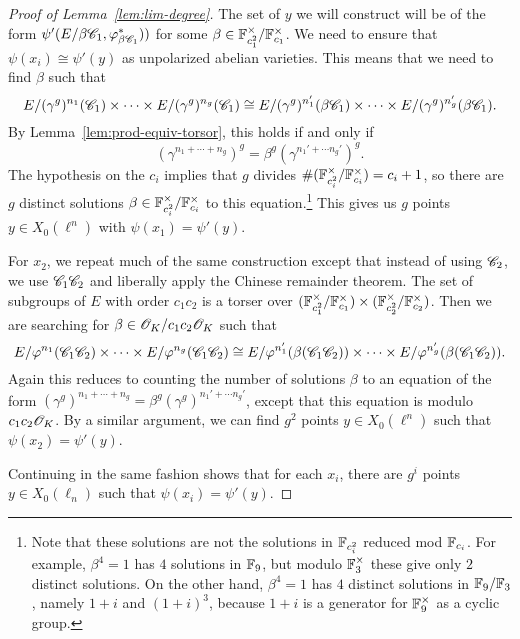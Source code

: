 \documentclass{amsart}
\begin{document}
\begin{proof}[Proof of Lemma~\ref{lem:lim-degree}]
  The set of $y$ we will construct will be of the form $\psi'(E/\beta\mathscr{C}_1,\varphi^{\ast}_{\beta\mathscr{C}_1}))$ for some $\beta \in \mathbb{F}_{c_1^2}^\times/\mathbb{F}_{c_1}^\times$. We need to ensure that $\psi(x_i) \cong \psi'(y)$ as unpolarized abelian varieties. This means that we need to find $\beta$ such that
  \[
    E/(\gamma^g)^{n_1}(\mathscr{C}_1) \times \cdots \times E/(\gamma^g)^{n_g}(\mathscr{C}_1)
    \cong
    E/(\gamma^g)^{n_1'}(\beta\mathscr{C}_1) \times \cdots \times E/(\gamma^g)^{n_g'}(\beta\mathscr{C}_1).
  \]
  By Lemma~\ref{lem:prod-equiv-torsor}, this holds if and only if
  \[
    (\gamma^{n_1 + \cdots + n_g})^g = \beta^g(\gamma^{n_1' + \cdots n_g'})^g.
  \]
  The hypothesis on the $c_i$ implies that $g$ divides $\#(\mathbb{F}_{c_i^2}^\times/\mathbb{F}_{c_i}^\times) = c_i + 1$, so there are $g$ distinct solutions $\beta \in \mathbb{F}_{c_i^2}^\times/\mathbb{F}_{c_i}^\times$ to this equation.\footnote{Note that these solutions are not the solutions in $\mathbb{F}_{c_i^2}$ reduced mod $\mathbb{F}_{c_i}$. For example, $\beta^4 = 1$ has $4$ solutions in $\mathbb{F}_9$, but modulo $\mathbb{F}_3^\times$ these give only $2$ distinct solutions. On the other hand, $\beta^4 = 1$ has $4$ distinct solutions in $\mathbb{F}_9/\mathbb{F}_3$, namely $1+i$ and $(1+i)^3$, because $1+i$ is a generator for $\mathbb{F}_9^\times$ as a cyclic group.} This gives us $g$ points $y \in X_0(\ell^n)$ with $\psi(x_1) = \psi'(y)$.

  For $x_2$, we repeat much of the same construction except that instead of using $\mathscr{C}_2$, we use $\mathscr{C}_1\mathscr{C}_2$ and liberally apply the Chinese remainder theorem. The set of subgroups of $E$ with order $c_1c_2$ is a torser over $(\mathbb{F}_{c_1^2}^\times/\mathbb{F}_{c_1}^\times) \times (\mathbb{F}_{c_2^2}^\times/\mathbb{F}_{c_2}^\times)$. Then we are searching for $\beta \in \mathscr{O}_K/c_1c_2\mathscr{O}_K$ such that
  \[
    E/\varphi^{n_1}(\mathscr{C}_1\mathscr{C}_2) \times \cdots \times E/\varphi^{n_g}(\mathscr{C}_1\mathscr{C}_2)
    \cong
    E/\varphi^{n_1'}(\beta(\mathscr{C}_1\mathscr{C}_2)) \times \cdots \times E/\varphi^{n_g'}(\beta(\mathscr{C}_1\mathscr{C}_2)).
  \]
  Again this reduces to counting the number of solutions $\beta$ to an equation of the form $(\gamma^{g})^{n_1 + \cdots + n_g} = \beta^g(\gamma^g)^{n_1' + \cdots n_g'}$, except that this equation is modulo $c_1c_2\mathscr{O}_K$. By a similar argument, we can find $g^2$ points $y \in X_0(\ell^n)$ such that $\psi(x_2) = \psi'(y)$.

  Continuing in the same fashion shows that for each $x_i$, there are $g^i$ points $y \in X_0(\ell_n)$ such that $\psi(x_i) = \psi'(y)$.
\end{proof}
\end{document}
